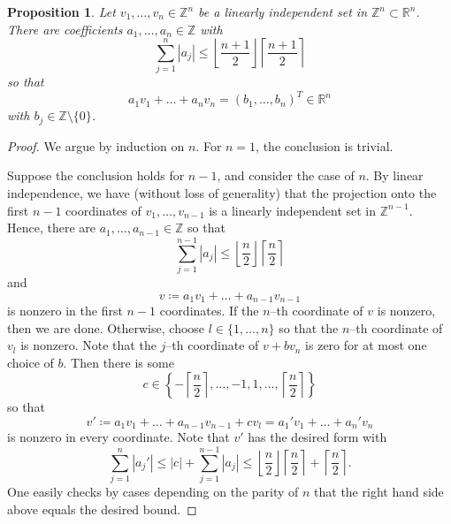 \documentclass[12pt]{amsart}
\newtheorem{proposition}[theorem]{Proposition}
\theoremstyle{definition}
\numberwithin{equation}{section}
\newcommand{\R}{\mathbb{R}}
\newcommand{\Z}{\mathbb{Z}}
\begin{document}
\begin{proposition}\label{prop:lin-alg}
Let $v_1, \hdots, v_n \in \Z^n$ be a linearly independent set in $\Z^n \subset \R^n$. There are coefficients $a_1, \hdots, a_n \in \Z$ with
\[ \sum_{j=1}^n |a_j| \leq \left\lfloor \frac{n+1}{2}\right\rfloor \left\lceil \frac{n+1}{2}\right\rceil \]
so that
\[ a_1v_1 + \hdots + a_n v_n = (b_1, \hdots, b_n)^T \in \R^n \]
with $b_j \in \Z \setminus \{0\}$.
\end{proposition}
\begin{proof}
We argue by induction on $n$. For $n = 1$, the conclusion is trivial.

Suppose the conclusion holds for $n-1$, and consider the case of $n$. By linear independence, we have (without loss of generality) that the projection onto the first $n-1$ coordinates of $v_1, \hdots, v_{n-1}$ is a linearly independent set in $\Z^{n-1}$. Hence, there are $a_1, \hdots, a_{n-1} \in \Z$ so that
\[ \sum_{j=1}^{n-1} |a_j| \leq \left\lfloor \frac{n}{2}\right\rfloor \left\lceil \frac{n}{2}\right\rceil \]
and
\[ v\coloneq a_1v_1 + \hdots + a_{n-1}v_{n-1} \]
is nonzero in the first $n-1$ coordinates. If the $n$--th coordinate of $v$ is nonzero, then we are done. Otherwise, choose $l \in \{1, \hdots, n\}$ so that the $n$--th coordinate of $v_l$ is nonzero. Note that the $j$--th coordinate of $v + bv_n$ is zero for at most one choice of $b$. Then there is some
\[ c \in \left\{-\left\lceil \frac{n}{2}\right\rceil, \hdots, -1, 1, \hdots, \left\lceil \frac{n}{2}\right\rceil\right\} \]
so that
\[ v' \coloneq a_1v_1 + \hdots + a_{n-1}v_{n-1} + cv_l = a_1'v_1 + \hdots + a_n'v_n \]
is nonzero in every coordinate. Note that $v'$ has the desired form with
\[ \sum_{j=1}^n |a_j'| \leq |c| + \sum_{j=1}^{n-1} |a_j| \leq \left\lfloor \frac{n}{2}\right\rfloor\left\lceil \frac{n}{2} \right\rceil + \left\lceil \frac{n}{2} \right\rceil. \]
One easily checks by cases depending on the parity of $n$ that the right hand side above equals the desired bound.
\end{proof}







 
 
\end{document}
